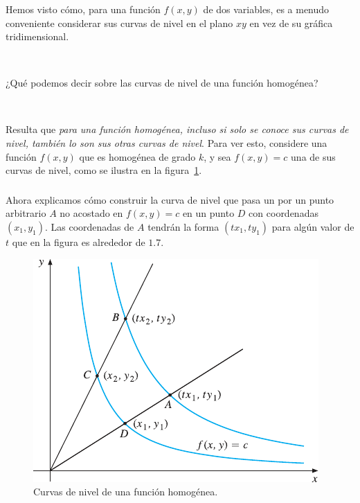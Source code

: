 \begin{frame}[t]
\frametitle{\subsecname}
Hemos visto cómo, para una función $f\left(x,y\right)$ de dos variables, es a menudo conveniente considerar sus curvas de nivel en el plano $xy$ en vez de su gráfica tridimensional.

\

¿Qué podemos decir sobre las curvas de nivel de una función homogénea?

\

Resulta que \emph{para una función homogénea, incluso si solo se conoce sus curvas de nivel, también lo son sus otras curvas de nivel}. Para ver esto, considere una función $f\left(x,y\right)$ que es homogénea de grado $k$, y sea $f\left(x,y\right)=c$ una de sus curvas de nivel, como se ilustra en la figura~\ref{fig:levelcurves}.
\end{frame}

\begin{frame}
	\frametitle{\subsecname}
	\begin{minipage}{0.45\textwidth}
		Ahora explicamos cómo construir la curva de nivel que pasa un por un punto arbitrario $A$ no acostado en $f\left(x,y\right)=c$ en un punto $D$ con coordenadas $\left(x_{1},y_{1}\right)$. Las coordenadas de $A$ tendrán la forma $\left(tx_{1},ty_{1}\right)$ para algún valor de $t$ que en la figura es alrededor de $1.7$.
	\end{minipage}
	\begin{minipage}{0.45\textwidth}
		\begin{figure}
			\centering
			\includegraphics[width=0.4\paperwidth]{levelcurves}
			\caption{Curvas de nivel de una función homogénea.}\label{fig:levelcurves}
		\end{figure}
	\end{minipage}
\end{frame}

